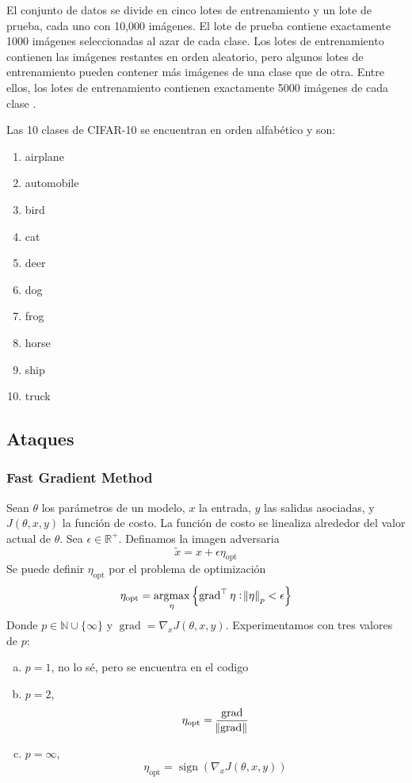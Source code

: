 El conjunto de datos se divide en cinco lotes de entrenamiento y un lote de prueba, cada uno con 10,000 imágenes. El lote de prueba contiene exactamente 1000 imágenes seleccionadas al azar de cada clase. Los lotes de entrenamiento contienen las imágenes restantes en orden aleatorio, pero algunos lotes de entrenamiento pueden contener más imágenes de una clase que de otra. Entre ellos, los lotes de entrenamiento contienen exactamente 5000 imágenes de cada clase \cite{cifarsite}. 

Las 10 clases de CIFAR-10 se encuentran en orden alfabético y son:
\begin{multicols}{5}
\begin{enumerate}
    \item airplane
    \item automobile
    \item bird
    \item cat
    \item deer
    \item dog
    \item frog
    \item horse
    \item ship
    \item truck
\end{enumerate}
\end{multicols}


\subsection{Ataques}

\subsubsection{Fast Gradient Method}
\cite{goodfellow2015explaining, maybe more}

Sean $\theta$ los parámetros de un modelo, $x$ la entrada, $y$ las salidas asociadas, y $J(\theta, x, y)$ la función de costo. La función de costo se linealiza alrededor del valor actual de $\theta$. Sea $\epsilon \in \mathbb{R}^+$. Definamos la imagen adversaria 
\[\tilde{x} = x + \epsilon \eta_{\text{opt}}\]
Se puede definir $\eta_{\text{opt}}$ por el problema de optimización
\[\eta_{\text{opt}} = \operatornamewithlimits{argmax}_{\eta}\left\{ \operatorname{grad} ^\top \eta: \norm{\eta}_p< \epsilon\right\}\]
Donde $p \in \mathbb{N} \cup \{\infty\}$ y $\operatorname{grad} = \nabla_x J(\theta, x, y)$. Experimentamos con tres valores de $p$:
\begin{enumerate}[a)]
    \item $p = 1$, no lo sé, pero se encuentra en el codigo
    \item $p = 2$,
    \[\eta_{\text{opt}} = \frac{\operatorname{grad}}{\norm{\operatorname{grad}}}\]
    \item $p = \infty$,
    \[\eta_{\text{opt}} = \operatorname{sign}(\nabla_x J(\theta, x, y))\]
\end{enumerate}

